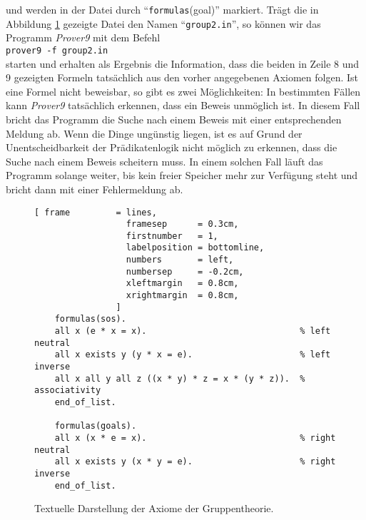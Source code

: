 und werden in der Datei durch ``\texttt{formulas}(goal)'' markiert.
Trägt die in Abbildung \ref{fig:group2.in} gezeigte Datei den Namen ``\texttt{group2.in}'', so können wir das
Programm \textsl{Prover9} mit dem Befehl 
\\[0.2cm]
\hspace*{1.3cm}
\texttt{prover9 -f group2.in}
\\[0.2cm]
starten und erhalten als Ergebnis die Information, dass die beiden in Zeile 8 und 9 gezeigten Formeln
tatsächlich aus den vorher angegebenen Axiomen folgen.  Ist eine Formel nicht beweisbar, so gibt es zwei Möglichkeiten:
In bestimmten Fällen kann \textsl{Prover9} tatsächlich erkennen, dass ein Beweis unmöglich ist.  In
diesem Fall bricht das Programm die Suche nach einem Beweis mit einer entsprechenden Meldung ab.
Wenn die Dinge ungünstig liegen, ist es auf Grund der Unentscheidbarkeit der Prädikatenlogik nicht
möglich zu erkennen, dass die Suche nach einem Beweis scheitern muss.  In einem solchen Fall
läuft das Programm solange weiter, bis kein freier Speicher mehr zur Verfügung steht und
bricht dann mit einer Fehlermeldung ab.


\begin{figure}[!ht]
\centering
\begin{Verbatim}[ frame         = lines, 
                  framesep      = 0.3cm, 
                  firstnumber   = 1,
                  labelposition = bottomline,
                  numbers       = left,
                  numbersep     = -0.2cm,
                  xleftmargin   = 0.8cm,
                  xrightmargin  = 0.8cm,
                ]
    formulas(sos).
    all x (e * x = x).                              % left neutral 
    all x exists y (y * x = e).                     % left inverse
    all x all y all z ((x * y) * z = x * (y * z)).  % associativity
    end_of_list.
    
    formulas(goals).
    all x (x * e = x).                              % right neutral 
    all x exists y (x * y = e).                     % right inverse
    end_of_list.
\end{Verbatim}
\vspace*{-0.3cm}
\caption{Textuelle Darstellung der Axiome der Gruppentheorie.}
\label{fig:group2.in}
\end{figure}


